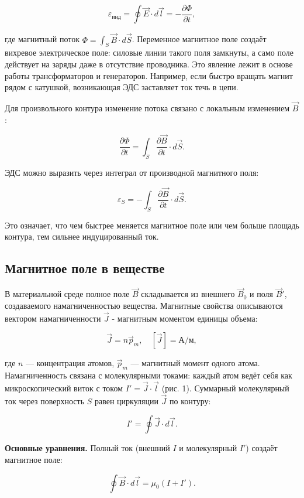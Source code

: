 \documentclass[12pt]{article}
\begin{document}
\[
    \varepsilon_{\text{инд}} = \oint \vec{E} \cdot d\vec{l} = -\frac{\partial \Phi}{\partial t},
\]

где магнитный поток $\Phi = \int_S \vec{B} \cdot d\vec{S}$. 
Переменное магнитное поле создаёт вихревое электрическое поле: 
силовые линии такого поля замкнуты, а само поле действует на заряды даже в отсутствие проводника. 
Это явление лежит в основе работы трансформаторов и генераторов. 
Например, если быстро вращать магнит рядом с катушкой, возникающая ЭДС заставляет ток течь в цепи.

Для произвольного контура изменение потока связано с локальным изменением $\vec{B}$:

\[
    \frac{\partial \Phi}{\partial t} = \int_S \frac{\partial \vec{B}}{\partial t} \cdot d\vec{S}.
\]

ЭДС можно выразить через интеграл от производной магнитного поля:

\[
    \varepsilon_S = -\int_S \frac{\partial \vec{B}}{\partial t} \cdot d\vec{S}.
\]

Это означает, что чем быстрее меняется магнитное поле или чем больше площадь контура, 
тем сильнее индуцированный ток.

\subsection{Магнитное поле в веществе}

В материальной среде полное поле $\vec{B}$ складывается из внешнего $\vec{B}_0$ и поля $\vec{B}'$, 
создаваемого намагниченностью вещества. Магнитные свойства описываются вектором намагниченности $\vec{J}$ - 
магнитным моментом единицы объема:

\[
    \vec{J} = n\vec{p}_m, \quad [\vec{J}] = \text{А/м},
\]


где $n$ — концентрация атомов, $\vec{p}_m$ — магнитный момент одного атома. Намагниченность связана с молекулярными токами: каждый атом ведёт себя как микроскопический виток с током $I' = \vec{J} \cdot \vec{l}$ (рис. 1). Суммарный молекулярный ток через поверхность $S$ равен циркуляции $\vec{J}$ по контуру:

\[
    I' = \oint \vec{J} \cdot d\vec{l}.
\]

\vspace{0.5cm}

\noindent\textbf{Основные уравнения.} Полный ток (внешний $I$ и молекулярный $I'$) создаёт магнитное поле:

\[
    \oint \vec{B} \cdot d\vec{l} = \mu_0(I + I').
\]
\end{document}
